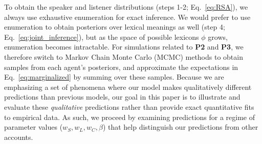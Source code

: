 To obtain the speaker and listener distributions (steps 1-2; Eq.~\ref{eq:RSA}), we always use exhaustive enumeration for exact inference.
We would prefer to use enumeration to obtain posteriors over lexical meanings as well (step 4; Eq.~\ref{eq:joint_inference}), but as the space of possible lexicons $\phi$ grows, enumeration becomes intractable.
For simulations related to \textbf{P2} and \textbf{P3}, we therefore switch to Markov Chain Monte Carlo (MCMC) methods to obtain samples from each agent's posteriors, and approximate the expectations in Eq.~\ref{eq:marginalized} by summing over these samples. 
Because we are emphasizing a set of phenomena where our model makes qualitatively different predictions than previous models, our goal in this paper is to illustrate and evaluate these \emph{qualitative} predictions rather than provide exact quantitative fits to empirical data.
As such, we proceed by examining predictions for a regime of parameter values ($w_S, w_L, w_C,\beta$) that help distinguish our predictions from other accounts.
